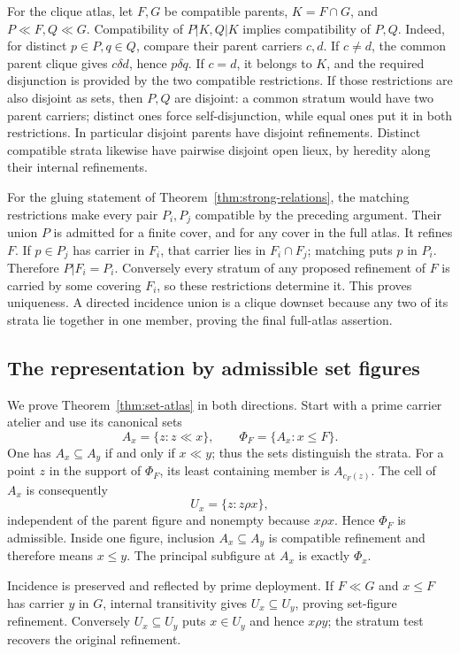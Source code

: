 For the clique atlas, let $F,G$ be compatible parents,
$K=F\cap G$, and $P\ll F,Q\ll G$.
Compatibility of $P|K,Q|K$ implies compatibility of $P,Q$.
Indeed, for distinct $p\in P,q\in Q$, compare their parent
carriers $c,d$. If $c\ne d$, the common parent clique gives
$c\delta d$, hence $p\delta q$. If $c=d$, it belongs to
$K$, and the required disjunction is provided by the two
compatible restrictions.
If those restrictions are also disjoint as sets, then $P,Q$
are disjoint: a common stratum would have two parent carriers;
distinct ones force self-disjunction, while equal ones put it
in both restrictions. In particular disjoint parents have
disjoint refinements. Distinct compatible strata likewise have
pairwise disjoint open lieux, by heredity along their internal
refinements.

For the gluing statement of Theorem~\ref{thm:strong-relations},
the matching restrictions make every pair $P_i,P_j$ compatible
by the preceding argument. Their union $P$ is admitted for a
finite cover, and for any cover in the full atlas. It refines $F$.
If $p\in P_j$ has carrier in $F_i$, that carrier lies in
$F_i\cap F_j$; matching puts $p$ in $P_i$.
Therefore $P|F_i=P_i$. Conversely every stratum of any proposed
refinement of $F$ is carried by some covering $F_i$, so these
restrictions determine it. This proves uniqueness.
A directed incidence union is a clique downset because any two
of its strata lie together in one member, proving the final
full-atlas assertion.

\subsection{The representation by admissible set figures}
We prove Theorem~\ref{thm:set-atlas} in both directions.
Start with a prime carrier atelier and use its canonical sets
\[
 A_x=\{z:z\ll x\},\qquad \Phi_F=\{A_x:x\leq F\}.
\]
One has $A_x\subseteq A_y$ if and only if $x\ll y$;
thus the sets distinguish the strata. For a point $z$ in the
support of $\Phi_F$, its least containing member is
$A_{c_F(z)}$. The cell of $A_x$ is consequently
\[
 U_x=\{z:z\rho x\},
\]
independent of the parent figure and nonempty because $x\rho x$.
Hence $\Phi_F$ is admissible.
Inside one figure, inclusion $A_x\subseteq A_y$ is compatible
refinement and therefore means $x\leq y$. The principal
subfigure at $A_x$ is exactly $\Phi_x$.

Incidence is preserved and reflected by prime deployment.
If $F\ll G$ and $x\leq F$ has carrier $y$ in $G$,
internal transitivity gives $U_x\subseteq U_y$, proving
set-figure refinement. Conversely $U_x\subseteq U_y$
puts $x\in U_y$ and hence $x\rho y$; the stratum test
recovers the original refinement.


